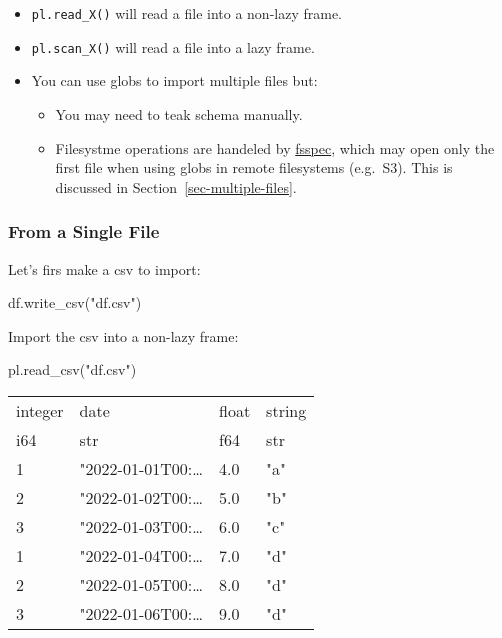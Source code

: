\documentclass[
  letterpaper,
  DIV=11,
  numbers=noendperiod]{scrartcl}
\newenvironment{Shaded}{\begin{snugshade}}{\end{snugshade}}
\newcommand{\NormalTok}[1]{\textcolor[rgb]{0.00,0.23,0.31}{#1}}
\newcommand{\StringTok}[1]{\textcolor[rgb]{0.13,0.47,0.30}{#1}}
\providecommand{\tightlist}{%
  \setlength{\itemsep}{0pt}\setlength{\parskip}{0pt}}\usepackage{longtable,booktabs,array}
\begin{document}
\begin{itemize}
\tightlist
\item
  \texttt{pl.read\_X()} will read a file into a non-lazy frame.
\item
  \texttt{pl.scan\_X()} will read a file into a lazy frame.
\item
  You can use globs to import multiple files but:

  \begin{itemize}
  \tightlist
  \item
    You may need to teak schema manually.
  \item
    Filesystme operations are handeled by
    \href{https://filesystem-spec.readthedocs.io/en/latest/}{fsspec},
    which may open only the first file when using globs in remote
    filesystems (e.g.~S3). This is discussed in
    Section~\ref{sec-multiple-files}.
  \end{itemize}
\end{itemize}

\hypertarget{from-a-single-file}{%
\subsubsection{From a Single File}\label{from-a-single-file}}

Let's firs make a csv to import:

\begin{Shaded}
\begin{Highlighting}[]
\NormalTok{df.write\_csv(}\StringTok{"df.csv"}\NormalTok{)}
\end{Highlighting}
\end{Shaded}

Import the csv into a non-lazy frame:

\begin{Shaded}
\begin{Highlighting}[]
\NormalTok{pl.read\_csv(}\StringTok{"df.csv"}\NormalTok{)}
\end{Highlighting}
\end{Shaded}

\begin{longtable}[]{@{}llll@{}}
\toprule()
integer & date & float & string \\
i64 & str & f64 & str \\
\midrule()
\endhead
1 & "2022-01-01T00:\ldots{} & 4.0 & "a" \\
2 & "2022-01-02T00:\ldots{} & 5.0 & "b" \\
3 & "2022-01-03T00:\ldots{} & 6.0 & "c" \\
1 & "2022-01-04T00:\ldots{} & 7.0 & "d" \\
2 & "2022-01-05T00:\ldots{} & 8.0 & "d" \\
3 & "2022-01-06T00:\ldots{} & 9.0 & "d" \\
\bottomrule()
\end{longtable}
\end{document}
